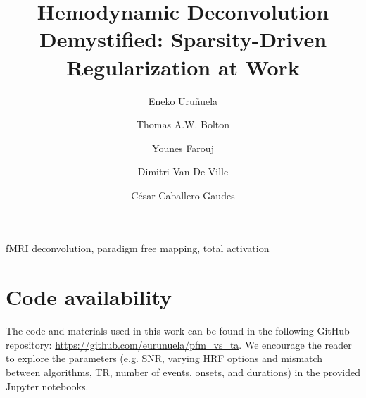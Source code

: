 \documentclass[preprint]{elsarticle}
\begin{document}
\begin{frontmatter}

\title{Hemodynamic Deconvolution Demystified: Sparsity-Driven Regularization at Work}

\author[bcbl,upv]{Eneko Uru\~nuela}

\author[chuv,epfl]{Thomas A.W. Bolton}
\author[epfl]{Younes Farouj}
\author[epfl,unige]{Dimitri Van De Ville}
\author[bcbl]{C\'{e}sar Caballero-Gaudes}

\address[bcbl]{Basque Center on Cognition, Brain and Language (BCBL), Donostia-San Sebasti\'{a}n, Spain.}
\address[upv]{University of the Basque Country (EHU/UPV), Donostia-San Sebasti\'{a}n, Spain.}
\address[chuv]{Gamma Knife Center, Department of Clinical Neuroscience, Centre Hospitalier Universitaire Vaudois (CHUV), Lausanne, Switzerland}
\address[epfl]{Ecole polytechnique f\'ed\'erale de Lausanne (EPFL), Lausanne, Switzerland.}
\address[unige]{Faculty of Medicine, University of Geneva, Geneva, Switzerland}

\begin{abstract}

\end{abstract}

\begin{keyword}
fMRI deconvolution, paradigm free mapping, total activation
\end{keyword}

\end{frontmatter}

\linenumbers











\section{Code availability}
\label{sec:github}
The code and materials used in this work can be found in the following GitHub repository: \url{https://github.com/eurunuela/pfm_vs_ta}. We encourage the reader to explore the parameters (e.g. SNR, varying HRF options and mismatch between algorithms, TR, number of events, onsets, and durations) in the provided Jupyter notebooks.
\end{document}
